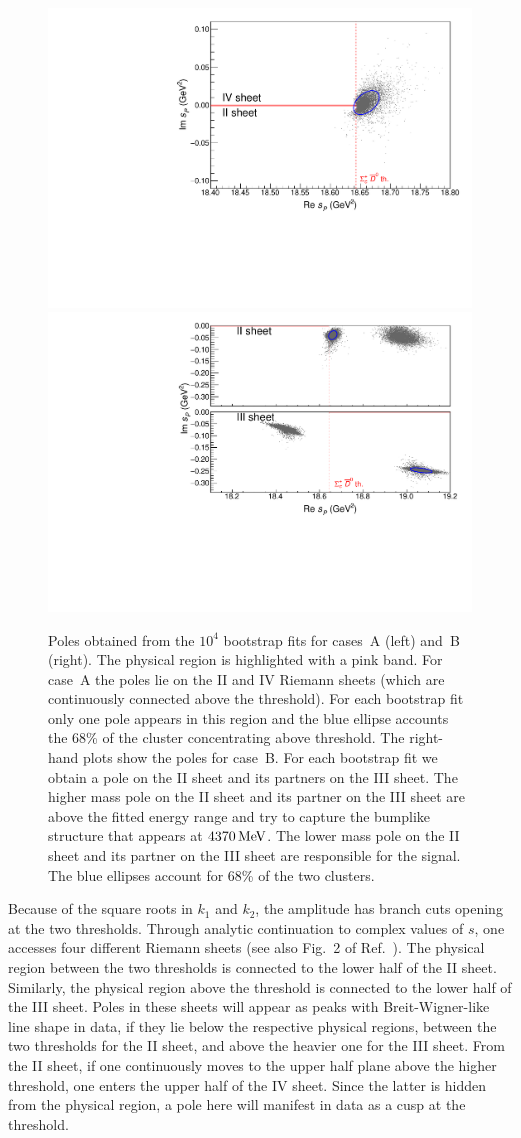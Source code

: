\documentclass[aps,prl,
twocolumn,nofootinbib,
superscriptaddress,preprintnumbers]{revtex4-1}
\begin{document}
\begin{figure}
\centering
\includegraphics[width=.49\textwidth]{general_nc.pdf}
\includegraphics[width=.49\textwidth]{general_yc.pdf}
\caption{
Poles obtained from the $10^4$ bootstrap fits
for cases~A (left) and~B (right). The physical region is highlighted with a pink band.
For case~A the poles lie on
the II and IV Riemann sheets
(which are continuously connected above the \SigmaD threshold).
For each bootstrap fit only one pole appears in this region 
and the blue ellipse accounts the 68\% of the cluster concentrating above threshold.
The right-hand plots show the poles for case~B. 
For each bootstrap fit we obtain a pole on the
II sheet and its partners on the III sheet.
The higher mass pole on the II sheet and its partner 
on the III sheet are above the fitted energy range and try
to capture the bumplike structure that appears at 
$4370{\mathrm{\,Me\kern -0.1em V}}$. The lower mass pole on the II sheet and its partner
on the III sheet are responsible for the \Pc signal. 
The blue ellipses  account for 68\% of the two clusters.
} \label{fig:poles}
\end{figure} 
Because of the square roots in $k_1$ and $k_2$, the amplitude has branch cuts opening at the two thresholds.
Through analytic continuation to complex values of $s$, one accesses four different Riemann sheets (see also Fig.~2 of Ref.~\cite{Pilloni:2016obd}). 
The physical region between the two thresholds is connected to the
  lower half of the II sheet. Similarly, the physical region above the \SigmaD threshold is connected to the 
  lower half of the III sheet. 
  Poles in these sheets will appear as peaks with Breit-Wigner-like line shape in data, if they lie
  below 
  the respective physical regions, \ie between the two thresholds for the II sheet, and above the heavier one for the III sheet.   
  From the II sheet, if one continuously moves to the upper 
   half plane above the higher threshold, one enters the upper half of the IV sheet. Since the latter is hidden from the physical region, a pole here will manifest in data as a cusp at the \SigmaD threshold. 
\end{document}
